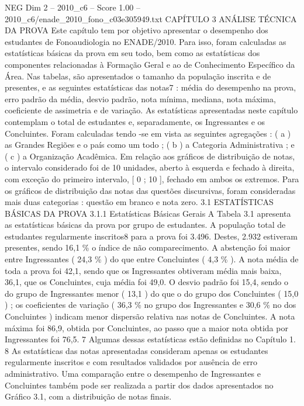 \begin{textsample}{NEG Dim 2 – 2010\_c6 – Score 1.00 – 2010\_c6/enade\_2010\_fono\_c03e305949.txt}  \label{ex:f2_neg_250}
CAPÍTULO 3 ANÁLISE TÉCNICA DA PROVA Este capítulo tem por objetivo apresentar o desempenho dos estudantes de Fonoaudiologia no ENADE/2010.
Para isso, foram calculadas as estatísticas básicas da prova em seu todo, bem como as estatísticas dos componentes relacionadas à Formação Geral e ao de Conhecimento Específico da Área.
Nas tabelas, são apresentados o tamanho da população inscrita e de presentes, e as seguintes estatísticas das notas7 : média do desempenho na prova, erro padrão da média, desvio padrão, nota mínima, mediana, nota máxima, coeficiente de assimetria e de variação.
As estatísticas apresentadas neste capítulo contemplam o total de estudantes e, separadamente, os Ingressantes e os Concluintes.
Foram calculadas tendo -se em vista as seguintes agregações : ( a ) as Grandes Regiões e o país como um todo ; ( b ) a Categoria Administrativa ; e ( c ) a Organização Acadêmica.
Em relação aos gráficos de distribuição de notas, o intervalo considerado foi de 10 unidades, aberto à esquerda e fechado à direita, com exceção do primeiro intervalo, [ 0 ; 10 ], fechado em ambos os extremos.
Para os gráficos de distribuição das notas das questões discursivas, foram consideradas mais duas categorias : questão em branco e nota zero. 3.1 ESTATÍSTICAS BÁSICAS DA PROVA 3.1.1 Estatísticas Básicas Gerais A Tabela 3.1 apresenta as estatísticas básicas da prova por grupo de estudantes.
A população total de estudantes regularmente inscritos8 para a prova foi 3.496.
Destes, 2.932 estiveram presentes, sendo 16,1 \% o índice de não comparecimento.
A abstenção foi maior entre Ingressantes ( 24,3 \% ) do que entre Concluintes ( 4,3 \% ).
A nota média de toda a prova foi 42,1, sendo que os Ingressantes obtiveram média mais baixa, 36,1, que os Concluintes, cuja média foi 49,0.
O desvio padrão foi 15,4, sendo o do grupo de Ingressantes menor ( 13,1 ) do que o do grupo dos Concluintes ( 15,0 ) ; os coeficientes de variação ( 36,3 \% no grupo dos Ingressantes e 30,6 \% no dos Concluintes ) indicam menor dispersão relativa nas notas de Concluintes.
A nota máxima foi 86,9, obtida por Concluintes, ao passo que a maior nota obtida por Ingressantes foi 76,5. 7 Algumas dessas estatísticas estão definidas no Capítulo 1. 8 As estatísticas das notas apresentadas consideram apenas os estudantes regularmente inscritos e com resultados validados por ausência de erro administrativo.
Uma comparação entre o desempenho de Ingressantes e Concluintes também pode ser realizada a partir dos dados apresentados no Gráfico 3.1, com a distribuição de notas finais.

\end{textsample}
